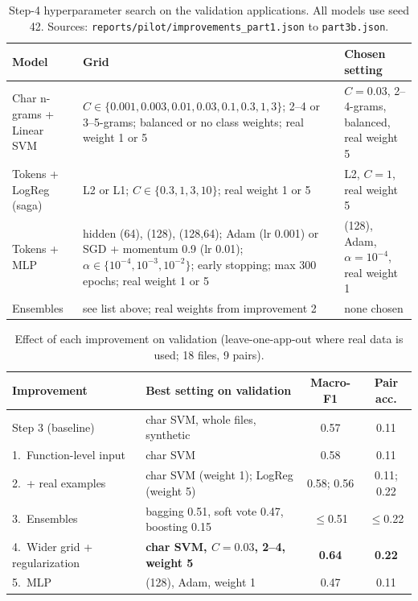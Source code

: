 \documentclass[11pt,a4paper]{article}
\newcommand{\code}[1]{\texttt{#1}}
\begin{document}
\begin{table}[H]
\centering\small
\begin{tabularx}{\linewidth}{@{}>{\raggedright\arraybackslash}p{3.0cm} >{\raggedright\arraybackslash}X >{\raggedright\arraybackslash}p{3.6cm}@{}}
\toprule
Model & Grid & Chosen setting \\
\midrule
Char n-grams + Linear SVM & $C\in\{0.001,0.003,0.01,0.03,0.1,0.3,1,3\}$; 2--4 or 3--5-grams; balanced or no class weights; real weight 1 or 5 & $C=0.03$, 2--4-grams, balanced, real weight 5 \\
Tokens + LogReg (saga) & L2 or L1; $C\in\{0.3,1,3,10\}$; real weight 1 or 5 & L2, $C=1$, real weight 5 \\
Tokens + MLP & hidden (64), (128), (128,64); Adam (lr 0.001) or SGD + momentum 0.9 (lr 0.01); $\alpha\in\{10^{-4},10^{-3},10^{-2}\}$; early stopping; max 300 epochs; real weight 1 or 5 & (128), Adam, $\alpha=10^{-4}$, real weight 1 \\
Ensembles & see list above; real weights from improvement 2 & none chosen \\
\bottomrule
\end{tabularx}
\caption{Step-4 hyperparameter search on the validation applications. All models use seed
42. Sources: \code{reports/pilot/improvements\_part1.json} to \code{part3b.json}.}
\label{tab:improvehp}
\end{table}

\begin{table}[H]
\centering\small
\begin{tabular}{@{}llcc@{}}
\toprule
Improvement & Best setting on validation & Macro-F1 & Pair acc. \\
\midrule
Step 3 (baseline) & char SVM, whole files, synthetic & 0.57 & 0.11 \\
1.\ Function-level input & char SVM & 0.58 & 0.11 \\
2.\ + real examples & char SVM (weight 1); LogReg (weight 5) & 0.58; 0.56 & 0.11; 0.22 \\
3.\ Ensembles & bagging 0.51, soft vote 0.47, boosting 0.15 & $\le$0.51 & $\le$0.22 \\
4.\ Wider grid + regularization & \textbf{char SVM, $C=0.03$, 2--4, weight 5} & \textbf{0.64} & \textbf{0.22} \\
5.\ MLP & (128), Adam, weight 1 & 0.47 & 0.11 \\
\bottomrule
\end{tabular}
\caption{Effect of each improvement on validation (leave-one-app-out where real data is
used; 18 files, 9 pairs).}
\label{tab:improvesteps}
\end{table}
\end{document}

